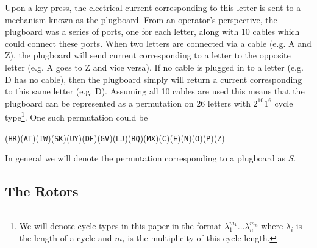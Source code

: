 
Upon a key press, the electrical current corresponding to this letter
is sent to a mechanism known as the plugboard. From an operator's
perspective, the plugboard was a series of ports, one for each
letter, along with 10 cables which could connect these ports. When
two letters are connected via a cable (e.g. A and Z), the plugboard
will send current corresponding to a letter to the opposite letter
(e.g. A goes to Z and vice versa). If no cable is plugged in to a
letter (e.g. D has no cable), then the plugboard simply will return a
current corresponding to this same letter (e.g. D). Assuming all 10
cables are used this means that the plugboard can be represented as a
permutation on 26 letters with $2^{10}1^6$ cycle type\footnote{We
  will denote cycle types in this paper in the format
  $\lambda_1^{m_1}\dots\lambda_n^{m_n}$ where $\lambda_i$ is the length
of a cycle and $m_i$ is the multiplicity of this cycle length.}. One such
permutation could be
\begin{center}
  (\texttt{HR})(\texttt{AT})(\texttt{IW})(\texttt{SK})(\texttt{UY})(\texttt{DF})(\texttt{GV})(\texttt{LJ})(\texttt{BQ})(\texttt{MX})(\texttt{C})(\texttt{E})(\texttt{N})(\texttt{O})(\texttt{P})(\texttt{Z})
\end{center}
In general we will denote the permutation corresponding to a plugboard as $S$.

\subsection{The Rotors}

